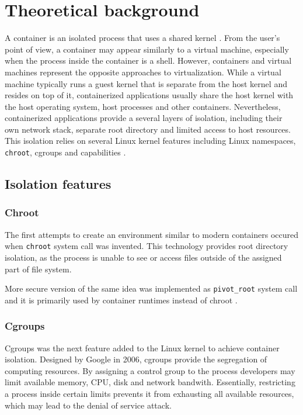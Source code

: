 \section{Theoretical background}

A container is an isolated process that uses a shared kernel \cite{1}. From the user's point of view, a container may appear similarly to a virtual machine, especially when the process inside the container is a shell. However, containers and virtual machines represent the opposite approaches to virtualization. While a virtual machine typically runs a guest kernel that is separate from the host kernel and resides on top of it, containerized applications usually share the host kernel with the host operating system, host processes and other containers. Nevertheless, containerized applications provide a several layers of isolation, including their own network stack, separate root directory and limited access to host resources. This isolation relies on several Linux kernel features including Linux namespaces, \texttt{chroot}, cgroups and capabilities \cite{book:rice}.

\subsection{Isolation features}

\subsubsection{Chroot}

The first attempts to create an environment similar to modern containers occured when \texttt{chroot} system call was invented. This technology provides root directory isolation, as the process is unable to see or access files outside of the assigned part of file system.

More secure version of the same idea was implemented as \texttt{pivot\_root} system call and it is primarily used by container runtimes instead of chroot \cite{book:rice}.

\subsubsection{Cgroups}

Cgroups was the next feature added to the Linux kernel to achieve container isolation. Designed by Google in 2006, cgroups provide the segregation of computing resources. By assigning a control group to the process developers may limit available memory, CPU, disk and network bandwith. Essentially, restricting a process inside certain limits prevents it from exhausting all available resources, which may lead to the denial of service attack.

